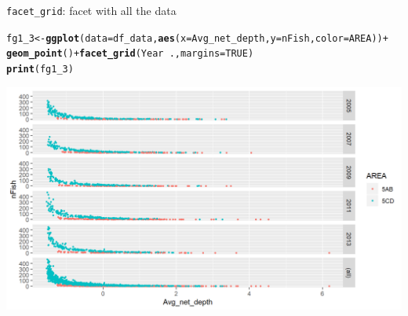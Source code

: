 \documentclass{beamer}\usepackage[]{graphicx}\usepackage[]{color}
\makeatletter
\newcommand{\hlnum}[1]{\textcolor[rgb]{0.686,0.059,0.569}{#1}}%
\newcommand{\hlopt}[1]{\textcolor[rgb]{0,0,0}{#1}}%
\newcommand{\hlstd}[1]{\textcolor[rgb]{0.345,0.345,0.345}{#1}}%
\newcommand{\hlkwb}[1]{\textcolor[rgb]{0.69,0.353,0.396}{#1}}%
\newcommand{\hlkwc}[1]{\textcolor[rgb]{0.333,0.667,0.333}{#1}}%
\newcommand{\hlkwd}[1]{\textcolor[rgb]{0.737,0.353,0.396}{\textbf{#1}}}%
\newenvironment{kframe}{%
 \def\at@end@of@kframe{}%
 \ifinner\ifhmode%
  \def\at@end@of@kframe{\end{minipage}}%
  \begin{minipage}{\columnwidth}%
 \fi\fi%
 \def\FrameCommand##1{\hskip\@totalleftmargin \hskip-\fboxsep
 \colorbox{shadecolor}{##1}\hskip-\fboxsep
     \hskip-\linewidth \hskip-\@totalleftmargin \hskip\columnwidth}%
 \MakeFramed {\advance\hsize-\width
   \@totalleftmargin\z@ \linewidth\hsize
   \@setminipage}}%
 {\par\unskip\endMakeFramed%
 \at@end@of@kframe}
\newenvironment{knitrout}{}{} %
\makeatother
\begin{document}
\begin{frame}[fragile]{\lstinline{facet_grid}: facet with all the data}
\begin{knitrout}\footnotesize
{}\color{fgcolor}\begin{kframe}
\begin{alltt}
\hlstd{fg1_3} \hlkwb{<-} \hlkwd{ggplot}\hlstd{(}\hlkwc{data}\hlstd{=df_data,} \hlkwd{aes}\hlstd{(}\hlkwc{x}\hlstd{=Avg_net_depth,} \hlkwc{y}\hlstd{=nFish,} \hlkwc{color}\hlstd{=AREA))} \hlopt{+}
  \hlkwd{geom_point}\hlstd{()} \hlopt{+} \hlkwd{facet_grid}\hlstd{(Year} \hlopt{~} \hlstd{.,} \hlkwc{margins} \hlstd{=} \hlnum{TRUE}\hlstd{)}
\hlkwd{print}\hlstd{(fg1_3)}
\end{alltt}
\end{kframe}

{\centering \includegraphics[width=.9\linewidth]{figure/facet_grid_3-1} 

}



\end{knitrout}
\end{frame}
\end{document}
